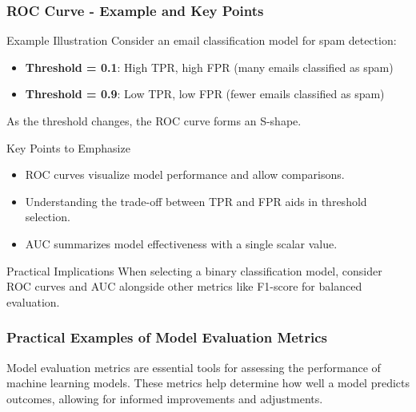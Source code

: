 \documentclass[aspectratio=169]{beamer}
\begin{document}
\begin{frame}[fragile]
    \frametitle{ROC Curve - Example and Key Points}
    \begin{block}{Example Illustration}
        Consider an email classification model for spam detection:
        \begin{itemize}
            \item \textbf{Threshold = 0.1}: High TPR, high FPR (many emails classified as spam)
            \item \textbf{Threshold = 0.9}: Low TPR, low FPR (fewer emails classified as spam)
        \end{itemize}
        As the threshold changes, the ROC curve forms an S-shape.
    \end{block}
    
    \begin{block}{Key Points to Emphasize}
        \begin{itemize}
            \item ROC curves visualize model performance and allow comparisons.
            \item Understanding the trade-off between TPR and FPR aids in threshold selection.
            \item AUC summarizes model effectiveness with a single scalar value.
        \end{itemize}
    \end{block}
    
    \begin{block}{Practical Implications}
        When selecting a binary classification model, consider ROC curves and AUC alongside other metrics like F1-score for balanced evaluation.
    \end{block}
\end{frame}

\begin{frame}[fragile]
    \frametitle{Practical Examples of Model Evaluation Metrics}
    Model evaluation metrics are essential tools for assessing the performance of machine learning models. These metrics help determine how well a model predicts outcomes, allowing for informed improvements and adjustments. 
\end{frame}
\end{document}
